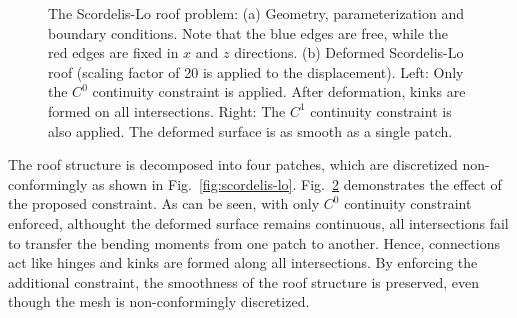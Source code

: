 \begin{figure}[h]
\begin{subfigure}[b]{.66\textwidth}
		\caption{}\label{fig:scordelis_deform}
	\end{subfigure}
	\caption{The Scordelis-Lo roof problem: (a) Geometry, parameterization and boundary conditions. Note that the blue edges are free, while the red edges are fixed in $x$ and $z$ directions. (b) Deformed Scordelis-Lo roof (scaling factor of 20 is applied to the displacement). Left: Only the $C^0$ continuity constraint is applied. After deformation, kinks are formed on all intersections. Right: The $C^1$ continuity constraint is also applied. The deformed surface is as smooth as a single patch.}
\end{figure}

The roof structure is decomposed into four patches, which are discretized non-conformingly as shown in Fig.~\ref{fig:scordelis-lo}. Fig.~\ref{fig:scordelis_deform} demonstrates the effect of the proposed constraint. As can be seen, with only $C^0$ continuity constraint enforced, althought the deformed surface remains continuous, all intersections fail to transfer the bending moments from one patch to another. Hence, connections act like hinges and kinks are formed along all intersections. By enforcing the additional constraint, the smoothness of the roof structure is preserved, even though the mesh is non-conformingly discretized. \par


